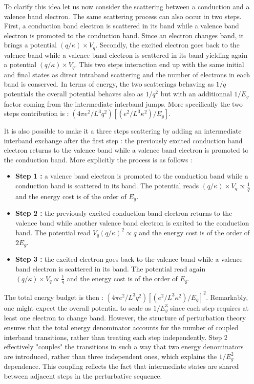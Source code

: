  
\bigskip


To clarify this idea let us now consider the scattering between a conduction and a valence band electron. 
The same scattering process can also occur in two steps. First, a conduction band electron is scattered in its band while a valence band electron is promoted to the conduction band. Since an electron changes band, it brings a potential $(q/\kappa)\times V_q$. Secondly, 
 the excited electron goes back to the valence band while a valence band electron is scattered in its band yielding again a potential $(q/\kappa)\times V_q$. This two steps interaction end up with the same initial and final states as direct intraband scattering and the number of electrons in each band is conserved.  
In terms of energy, the two scatterings behaving as $1/q$ potentials the overall potential behaves also as $1/q^2$ but with an additionnal $1/E_{g}$ factor coming from the intermediate interband jumps. More specifically the two steps contribution is : $\left( 4\pi e^2/L^3q^2 \right)\left[ (e^2/L^3\kappa^2)/E_{g}\right]$.  

\bigskip
It is also possible to make it a three steps scattering by adding an intermediate interband exchange after the first step : the previously excited conduction band electron returns to the valence band while a valence band electron is promoted to the conduction band. 
More explicitly the process is as follows : 

\begin{itemize}
    \item \textbf{Step 1 :} a valence band electron is promoted to the conduction band while a conduction band is scattered in its band. The potential reads $(q/\kappa)\times V_q \propto \frac{1}{q}$ and the energy cost is of the order of $E_g$.
    \item \textbf{Step 2 :} the previously excited conduction band electron returns to the valence band while another valence band electron is excited to the conduction band. The potential read $V_q(q/\kappa)^2 \propto q$ and the energy cost is of the order of $2E_g$.
    \item \textbf{Step 3 :} the excited electron goes back to the valence band while a valence band electron is scattered in its band. The potential read again $(q/\kappa)\times V_q \propto \frac{1}{q}$ and the energy cost is of the order of $E_g$.
\end{itemize}

\noindent The total energy budget is then : $\left( 4\pi e^2/L^3q^2 \right)\left[ (e^2/L^3\kappa^2)/E_{g}\right]^2$. Remarkably, one might expect the overall potential to scale as $1/E_g^3$  since each step requires at least one electron to change band. However, the structure of perturbation theory ensures that the total energy denominator accounts for the number of coupled interband transitions, rather than treating each step independently. 
Step 2 effectively "couples" the transitions in such a way that two energy denominators are introduced, rather than three independent ones, which explains the 
$1/E_g^2$ dependence. This coupling reflects the fact that intermediate states are shared between adjacent steps in the perturbative sequence.
\bigskip 


